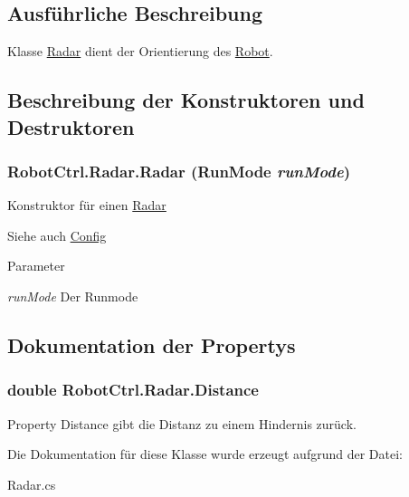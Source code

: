 \subsection{Ausführliche Beschreibung}
Klasse \hyperlink{class_robot_ctrl_1_1_radar}{Radar} dient der Orientierung des \hyperlink{class_robot_ctrl_1_1_robot}{Robot}. 

\subsection{Beschreibung der Konstruktoren und Destruktoren}
\hypertarget{class_robot_ctrl_1_1_radar_a40cb0f884bc4dc22d1e5dc5d05c947b2}{
\subsubsection[{Radar}]{\setlength{\rightskip}{0pt plus 5cm}RobotCtrl.Radar.Radar (RunMode {\em runMode})}}
\label{class_robot_ctrl_1_1_radar_a40cb0f884bc4dc22d1e5dc5d05c947b2}
Konstruktor f\"{u}r einen \hyperlink{class_robot_ctrl_1_1_radar}{Radar} \begin{DoxySeeAlso}{Siehe auch}
\hyperlink{class_robot_ctrl_1_1_config}{Config}
\end{DoxySeeAlso}

\begin{DoxyParams}{Parameter}
\item[{\em runMode}]Der Runmode \end{DoxyParams}


\subsection{Dokumentation der Propertys}
\hypertarget{class_robot_ctrl_1_1_radar_a0339d462806cb7fc3759d850b5564dd9}{
\subsubsection[{Distance}]{\setlength{\rightskip}{0pt plus 5cm}double RobotCtrl.Radar.Distance}}
\label{class_robot_ctrl_1_1_radar_a0339d462806cb7fc3759d850b5564dd9}
Property Distance gibt die Distanz zu einem Hindernis zur\"{u}ck. 

Die Dokumentation für diese Klasse wurde erzeugt aufgrund der Datei:\begin{DoxyCompactItemize}
\item 
Radar.cs\end{DoxyCompactItemize}
